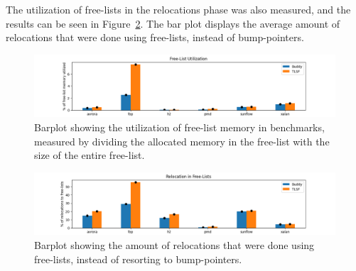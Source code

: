 The utilization of free-lists in the relocations phase was also measured, and the results can be seen in Figure~\ref*{fig:relocation-utilization}. The bar plot displays the average amount of relocations that were done using free-lists, instead of bump-pointers. 

\begin{figure}[H]
  \centering
  \includegraphics[width=1\textwidth]{figures/utilization.png}
  \caption{Barplot showing the utilization of free-list memory in benchmarks, measured by dividing the allocated memory in the free-list with the size of the entire free-list.}
  \label{fig:utilization}
\end{figure}

\begin{figure}[H]
  \centering
  \includegraphics[width=1\textwidth]{figures/relocation_utilization.png}
  \caption{Barplot showing the amount of relocations that were done using free-lists, instead of resorting to bump-pointers.} 
  \label{fig:relocation-utilization}
\end{figure}